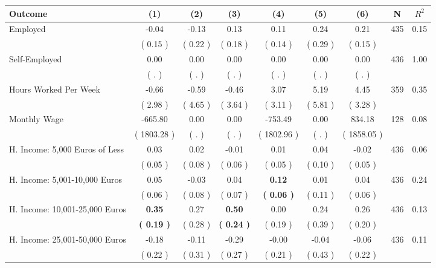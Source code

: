 \begin{tabular}{lcccccccc}
\toprule
 \textbf{Outcome} & \textbf{(1)} & \textbf{(2)} & \textbf{(3)} & \textbf{(4)} & \textbf{(5)} & \textbf{(6)} & \textbf{N} & \textbf{$ R^2$} \\
\midrule
Employed &     -0.04 &     -0.13 &      0.13 &      0.11 &      0.24 &      0.21 & 435 &       0.15 \\ 
 & (     0.15 ) & (     0.22 ) & (     0.18 ) & (     0.14 ) & (     0.29 ) & (     0.15 ) & \\
Self-Employed &      0.00 &      0.00 &      0.00 &      0.00 &      0.00 &      0.00 & 436 &       1.00 \\ 
 & (        . ) & (        . ) & (        . ) & (        . ) & (        . ) & (        . ) & \\
Hours Worked Per Week &     -0.66 &     -0.59 &     -0.46 &      3.07 &      5.19 &      4.45 & 359 &       0.35 \\ 
 & (     2.98 ) & (     4.65 ) & (     3.64 ) & (     3.11 ) & (     5.81 ) & (     3.28 ) & \\
Monthly Wage &   -665.80 &      0.00 &      0.00 &   -753.49 &      0.00 &    834.18 & 128 &       0.08 \\ 
 & (  1803.28 ) & (        . ) & (        . ) & (  1802.96 ) & (        . ) & (  1858.05 ) & \\
H. Income: 5,000 Euros of Less &      0.03 &      0.02 &     -0.01 &      0.01 &      0.04 &     -0.02 & 436 &       0.06 \\ 
 & (     0.05 ) & (     0.08 ) & (     0.06 ) & (     0.05 ) & (     0.10 ) & (     0.05 ) & \\
H. Income: 5,001-10,000 Euros &      0.05 &     -0.03 &      0.04 & \textbf{     0.12} &      0.01 &      0.04 & 436 &       0.24 \\ 
 & (     0.06 ) & (     0.08 ) & (     0.07 ) & \textbf{(     0.06 )} & (     0.11 ) & (     0.06 ) & \\
H. Income: 10,001-25,000 Euros & \textbf{     0.35} &      0.27 & \textbf{     0.50} &      0.00 &      0.24 &      0.26 & 436 &       0.13 \\ 
 & \textbf{(     0.19 )} & (     0.28 ) & \textbf{(     0.24 )} & (     0.19 ) & (     0.39 ) & (     0.20 ) & \\
H. Income: 25,001-50,000 Euros &     -0.18 &     -0.11 &     -0.29 &     -0.00 &     -0.04 &     -0.06 & 436 &       0.11 \\ 
 & (     0.22 ) & (     0.31 ) & (     0.27 ) & (     0.21 ) & (     0.43 ) & (     0.22 ) & \\

\end{tabular}
